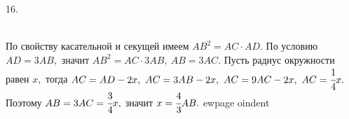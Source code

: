 16. \begin{figure}[ht!]
\end{figure}\\
По свойству касательной и секущей имеем $AB^2=AC\cdot AD.$ По условию $AD=3AB,$ значит $AB^2=AC\cdot3AB,\ AB=3AC.$ Пусть радиус окружности равен $x,$ тогда $AC=AD-2x,\ AC=3AB-2x,\ AC=9AC-2x,\ AC=\cfrac{1}{4}x.$ Поэтому $AB=3AC=\cfrac{3}{4}x,$ значит $x=\cfrac{4}{3}AB.$
ewpage
oindent
